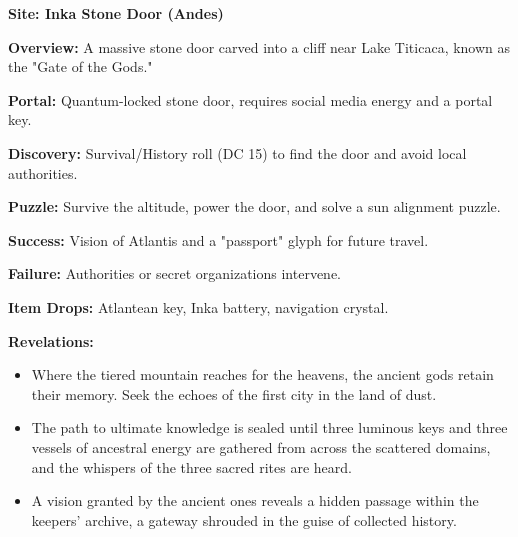 \documentclass[12pt]{article}
\begin{document}
\textbf{Site: Inka Stone Door (Andes)}

\textbf{Overview:}  
A massive stone door carved into a cliff near Lake Titicaca, known as the "Gate of the Gods."

\textbf{Portal:}  
Quantum-locked stone door, requires social media energy and a portal key.

\textbf{Discovery:}  
Survival/History roll (DC 15) to find the door and avoid local authorities.

\textbf{Puzzle:}  
Survive the altitude, power the door, and solve a sun alignment puzzle.

\textbf{Success:}  
Vision of Atlantis and a "passport" glyph for future travel.

\textbf{Failure:}  
Authorities or secret organizations intervene.

\textbf{Item Drops:}  
Atlantean key, Inka battery, navigation crystal.

\textbf{Revelations:}
\begin{itemize}
  \item Where the tiered mountain reaches for the heavens, the ancient gods retain their memory. Seek the echoes of the first city in the land of dust.
  \item The path to ultimate knowledge is sealed until three luminous keys and three vessels of ancestral energy are gathered from across the scattered domains, and the whispers of the three sacred rites are heard.
  \item A vision granted by the ancient ones reveals a hidden passage within the keepers' archive, a gateway shrouded in the guise of collected history.
\end{itemize}
\end{document}
